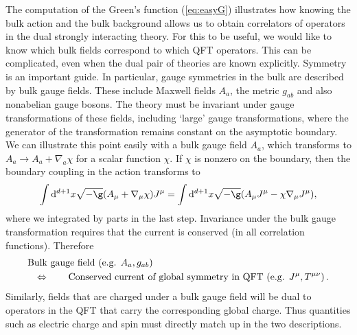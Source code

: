 \documentclass[10pt, oneside]{book}
\newcommand{\bea}{\begin{eqnarray}}
\newcommand{\eea}{\end{eqnarray}}
\begin{document}
\begin{doublespace}
The computation of the Green's function (\ref{eq:easyG}) illustrates how knowing the bulk action and the bulk background allows us to obtain correlators of operators in the dual strongly interacting theory. For this to be useful, we would like to know which bulk fields correspond to which QFT operators. This can be complicated, even when the dual pair of theories are known explicitly. Symmetry is an important guide. In particular, gauge symmetries in the bulk are described by bulk gauge fields. These include Maxwell fields $A_a$, the metric $g_{ab}$ and also nonabelian gauge bosons. The theory must be invariant under gauge transformations of these fields, including `large' gauge transformations, where the generator of the transformation remains constant on the asymptotic boundary. We can illustrate this point easily with a bulk gauge field $A_a$, which transforms to $A_a \rightarrow A_a + \nabla_a \chi$ for a scalar function $\chi$. If $\chi$ is nonzero on the boundary, then the boundary coupling in the action transforms to \begin{equation}
\int \mathrm{d}^{d+1}x \sqrt{-\g} (A_\mu + \nabla_\mu \chi) J^\mu  = \int \mathrm{d}^{d+1}x \sqrt{-\g} (A_\mu J^\mu - \chi\nabla_\mu J^\mu ), 
\end{equation}
where we integrated by parts in the last step.  Invariance under the bulk gauge transformation requires that the current is conserved (in all correlation functions).
Therefore
\bea
\lefteqn{\text{Bulk gauge field (e.g. $A_a, g_{ab})$}} \nonumber \\
 & & \Leftrightarrow \qquad \text{Conserved current of global symmetry in QFT (e.g. $J^\mu, T^{\mu\nu}$)} \,. \label{eq:JA}
\eea
Similarly, fields that are charged under a bulk gauge field will be dual to operators in the QFT that carry the corresponding global charge. Thus quantities such as electric charge and spin must directly match up in the two descriptions.


\end{doublespace}
\end{document}

